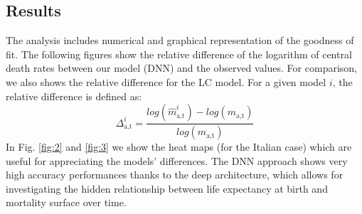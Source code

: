 \documentclass[a4,11pt]{article}
\begin{document}
\subsection{Results}
The analysis includes numerical and graphical representation of the goodness of fit.
The following figures show the relative difference of the logarithm of central death rates between our model (DNN) and the observed values. For comparison, we also shows the relative difference for the LC model. For a given model $i$, the relative difference is defined as:
$$\Delta_{\text{a,t}}^{i}=\frac{log(\hat{m}_{\text{a,t}}^{i})-log(m_{\text{a,t}})}{log(m_{\text{a,t}})}$$
In Fig. \ref{fig:2} and \ref{fig:3} we show the heat maps (for the Italian case) which are useful for appreciating the models' differences. The DNN approach shows very high accuracy performances thanks to the deep architecture, which allows for investigating the hidden relationship between life expectancy at birth and mortality surface over time.
\end{document}
